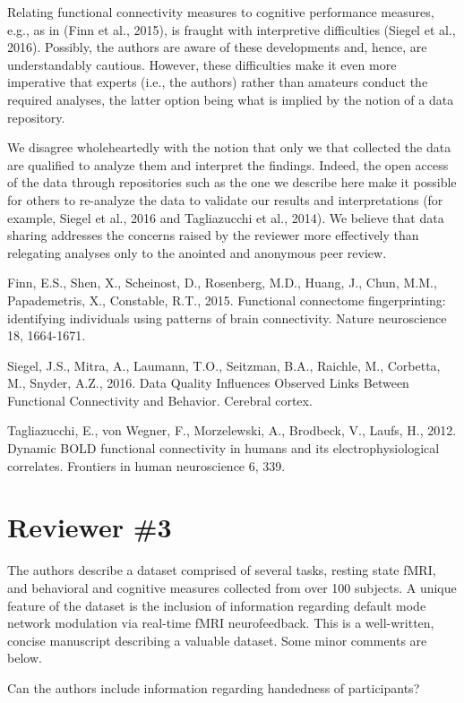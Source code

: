 \documentclass{article}
\newcommand{\RESPONSE}[1]{\textcolor{responseblue}{#1}}
\begin{document}
Relating functional connectivity measures to cognitive performance measures, e.g., as in (Finn et al., 2015), is fraught with interpretive difficulties (Siegel et al., 2016). Possibly, the authors are aware of these developments and, hence, are understandably cautious. However, these difficulties make it even more imperative that experts (i.e., the authors) rather than amateurs conduct the required analyses, the latter option being what is implied by the notion of a data repository.

\RESPONSE{We disagree wholeheartedly with the notion that only we that collected the data are qualified to analyze them and interpret the findings. Indeed, the open access of the data through repositories such as the one we describe here make it possible for others to re-analyze the data to validate our results and interpretations (for example, Siegel et al., 2016 and Tagliazucchi et al., 2014). We believe that data sharing addresses the concerns raised by the reviewer more effectively than relegating analyses only to the anointed and anonymous peer review.}

Finn, E.S., Shen, X., Scheinost, D., Rosenberg, M.D., Huang, J., Chun, M.M., Papademetris, X., Constable, R.T., 2015. Functional connectome fingerprinting: identifying individuals using patterns of brain connectivity. Nature neuroscience 18, 1664-1671.

Siegel, J.S., Mitra, A., Laumann, T.O., Seitzman, B.A., Raichle, M., Corbetta, M., Snyder, A.Z., 2016. Data Quality Influences Observed Links Between Functional Connectivity and Behavior. Cerebral cortex.

Tagliazucchi, E., von Wegner, F., Morzelewski, A., Brodbeck, V., Laufs, H., 2012. Dynamic BOLD functional connectivity in humans and its electrophysiological correlates. Frontiers in human neuroscience 6, 339.

\section*{Reviewer \#3}

The authors describe a dataset comprised of several tasks, resting state fMRI, and behavioral and cognitive measures collected from over 100 subjects. A unique feature of the dataset is the inclusion of information regarding default mode network modulation via real-time fMRI neurofeedback. This is a well-written, concise manuscript describing a valuable dataset. Some minor comments are below.

Can the authors include information regarding handedness of participants?
\end{document}
